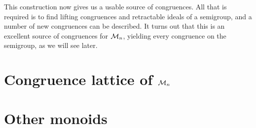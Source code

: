 This construction now gives us a usable source of congruences.  All that is
required is to find lifting congruences and retractable ideals of a semigroup,
and a number of new congruences can be described.  It turns out that this is an
excellent source of congruences for $\mathcal{M}_n$, yielding every congruence on the
semigroup, as we will see later.

\section{Congruence lattice of $\mathcal{M}_n$}
\label{sec:motzkin-congs}


\section{Other monoids}
\label{sec:motzkin-other}
